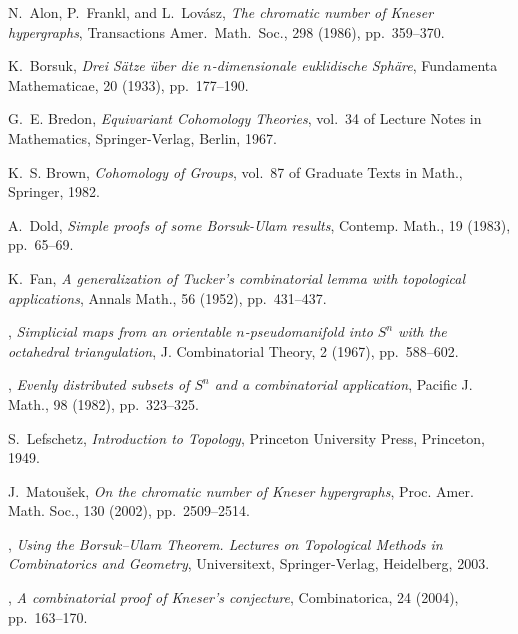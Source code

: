 \documentclass[11pt,a4paper,draft]{article}
\theoremstyle{definition}
\begin{document}
\begin{small}
\begin{thebibliography}{10}

{\sc N.~Alon, P.~Frankl, and L.~Lov{\'a}sz}, {\em The chromatic number of
  {K}neser hypergraphs}, Transactions Amer.\ Math.\ Soc., 298 (1986),
  pp.~359--370.

{\sc K.~Borsuk}, {\em Drei {S}{\"a}tze {\"u}ber die $n$-dimensionale
  euklidische {S}ph{\"a}re}, Fundamenta Mathematicae, 20 (1933), pp.~177--190.

{\sc G.~E. Bredon}, {\em Equivariant Cohomology Theories}, vol.~34 of Lecture
  Notes in Mathematics, Springer-Verlag, Berlin, 1967.

{\sc K.~S. Brown}, {\em Cohomology of Groups}, vol.~87 of Graduate Texts in
  Math., Springer, 1982.

{\sc A.~Dold}, {\em Simple proofs of some {Borsuk-Ulam} results}, Contemp.
  Math., 19 (1983), pp.~65--69.

{\sc K.~Fan}, {\em A generalization of {T}ucker's combinatorial lemma with
  topological applications}, Annals Math., 56 (1952), pp.~431--437.

\leavevmode\vrule height 2pt depth -1.6pt width 23pt, {\em Simplicial maps from
  an orientable $n$-pseudomanifold into ${S}^n$ with the octahedral
  triangulation}, J. Combinatorial Theory, 2 (1967), pp.~588--602.

\leavevmode\vrule height 2pt depth -1.6pt width 23pt, {\em Evenly distributed
  subsets of ${S}^n$ and a combinatorial application}, Pacific J. Math., 98
  (1982), pp.~323--325.

{\sc S.~Lefschetz}, {\em Introduction to Topology}, Princeton University Press,
  Princeton, 1949.

{\sc J.~Matou\v{s}ek}, {\em On the chromatic number of {K}neser hypergraphs},
  Proc. Amer. Math. Soc., 130 (2002), pp.~2509--2514.

\leavevmode\vrule height 2pt depth -1.6pt width 23pt, {\em {Using the
  {Borsuk--Ulam} Theorem. {L}ectures on Topological Methods in Combinatorics
  and Geometry}}, Universitext, Springer-Verlag, Heidelberg, 2003.

\leavevmode\vrule height 2pt depth -1.6pt width 23pt, {\em A combinatorial
  proof of {K}neser's conjecture}, Combinatorica, 24 (2004), pp.~163--170.


\end{thebibliography}
\end{small}
\end{document}
